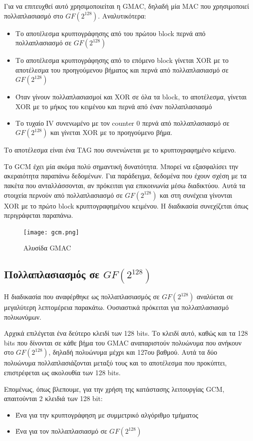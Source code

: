 \documentclass[a4paper, 11pt]{article}
\newcommand{\lt}{\latintext}
\begin{document}
\begin{itemize}
	Για να επιτευχθεί αυτό χρησιμοποιείται η {\lt GMAC}, δηλαδή μία {\lt MAC} που χρησιμοποιεί πολλαπλασιασμό στο $GF(2^{128})$. Αναλυτικότερα:
	\begin{itemize}
		\item Το αποτέλεσμα κρυπτογράφησης από του πρώτου {\lt block} περνά από πολλαπλασιασμό σε $GF(2^{128})$
		\item Το αποτέλεσμα κρυπτογράφησης από το επόμενο {\lt block} γίνεται {\lt XOR} με το αποτέλεσμα του προηγούμενου βήματος και περνά από πολλαπλασιασμό σε $GF(2^{128})$
		\item Όταν γίνουν πολλαπλασιασμοί και {\lt XOR} σε όλα τα {\lt block}, το αποτέλεσμα, γίνεται {\lt XOR} με το μήκος του κειμένου και περνά από έναν πολλαπλασιασμό
		\item Το τυχαίο {\lt IV} συνενωμένο με τον {\lt counter 0} περνά από πολλαπλασιασμό σε $GF(2^{128})$ και γίνεται {\lt XOR} με το προηγούμενο βήμα.
	\end{itemize}
	Το αποτέλεσμα είναι ένα {\lt TAG} που συνενώνεται με το κρυπτογραφημένο κείμενο.

	Το {\lt GCM} έχει μία ακόμα πολύ σημαντική δυνατότητα. Μπορεί να εξασφαλίσει την ακεραιότητα παραπάνω δεδομένων. Για παράδειγμα, δεδομένα που έχουν σχέση με τα πακέτα που ανταλλάσσονται, αν πρόκειται για επικοινωνία μέσω διαδικτύου. Αυτά τα στοιχεία περνούν από πολλαπλασιασμό σε $GF(2^{128})$ και στη συνέχεια γίνονται {\lt XOR} με το πρώτο {\lt block} κρυπτογραφημένου κειμένου. Η διαδικασία συνεχίζεται όπως περιγράφεται παραπάνω.
	\begin{figure}[!ht]
	\centering
	\texttt{[image: gcm.png]}
	\caption{Αλυσίδα {\lt GMAC}}
	\end{figure}

	\subsection*{Πολλαπλασιασμός σε $GF(2^{128})$}
	Η διαδικασία που αναφέρθηκε ως πολλαπλασιασμός σε $GF(2^{128})$ αναλύεται σε μεγαλύτερη λεπτομέρεια παρακάτω. Ουσιαστικά πρόκειται για πολλαπλασιασμό πολυωνύμων.

	Αρχικά επιλέγεται ένα δεύτερο κλειδί των 128 {\lt bits}. Το κλειδί αυτό, καθώς και τα 128 {\lt bits} που δίνονται σε κάθε βήμα του {\lt GMAC} αναπαριστούν πολυώνυμα που ανήκουν στο $GF(2^{128})$, δηλαδή πολυώνυμα μέχρι και 127ου βαθμού. Αυτά τα δύο πολυώνυμα πολλαπλασιάζονται μεταξύ τους και το αποτέλεσμα που προκύπτει, επιστρέφεται ως ακολουθία των 128 {\lt bits}.

	Επομένως, όπως βλεπουμε, για την χρήση της κατάστασης λειτουργίας {\lt GCM}, απαιτούνται 2 κλειδιά των 128 {\lt bit}:
	\begin{itemize}
		\item Ένα για την κρυπτογράφηση με συμμετρικό αλγόριθμο τμήματος
		\item Ένα για τον πολλαπλασιασμό σε $GF(2^{128})$
	\end{itemize}
	
\end{itemize}
\end{document}
